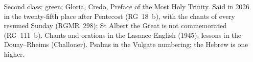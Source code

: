 \vspace{0.1em}
{\footnotesize\noindent Second class; green; Gloria, Credo, Preface of the
Most Holy Trinity. Said in 2026 in the twenty-fifth place after Pentecost
(RG~18~b), with the chants of every resumed Sunday (RGMR~298); St Albert the
Great is not commemorated (RG~111~b). Chants and orations in the Lasance
English (1945), lessons in the Douay--Rheims (Challoner). Psalms in the
Vulgate numbering; the Hebrew is one higher.\par}
